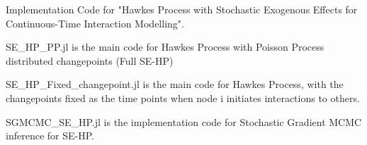 Implementation Code for "Hawkes Process with Stochastic Exogenous Effects for Continuous-Time Interaction Modelling". 

SE_HP_PP.jl is the main code for Hawkes Process with Poisson Process distributed changepoints (Full SE-HP)

SE_HP_Fixed_changepoint.jl is the main code for Hawkes Process, with the changepoints fixed as the time points when node i initiates interactions to others.

SGMCMC_SE_HP.jl is the implementation code for Stochastic Gradient MCMC inference for SE-HP. 